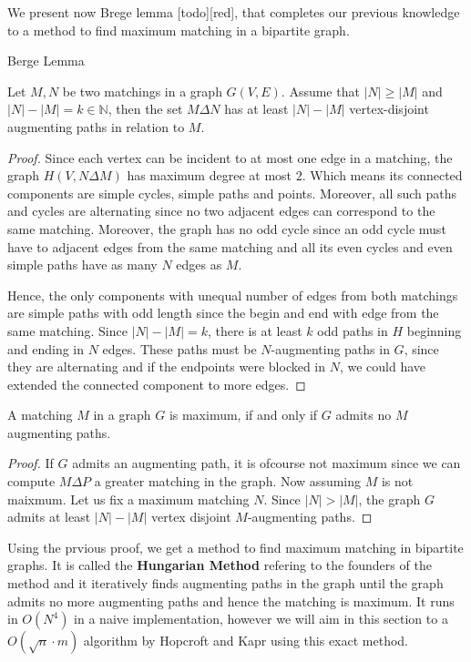 We present now Brege lemma [todo][red], that completes our previous knowledge to a method to find maximum matching in a bipartite graph.
\begin{lemma}Berge Lemma

	Let $M, N$ be two matchings in a graph $G(V, E)$. Assume that $|N| \geq |M|$ and $|N| - |M| = k \in \mathbb{N}$, then the set $M \Delta N$ has at least $|N| - |M|$ vertex-disjoint augmenting paths in relation to $M$.
\end{lemma}
\begin{proof}
	Since each vertex can be incident to at most one edge in a matching, the graph $H(V, N \Delta M)$ has maximum degree at most $2$. Which means its connected components are simple cycles, simple paths and points. Moreover, all such paths and cycles are alternating since no two adjacent edges can correspond to the same matching. Moreover, the graph has no odd cycle since an odd cycle must have to adjacent edges from the same matching and all its even cycles and even simple paths have as many $N$ edges as $M$.

	Hence, the only components with unequal number of edges from both matchings are simple paths with odd length since the begin and end with edge from the same matching. Since $|N| - |M| = k$, there is at least $k$ odd paths in $H$ beginning and ending in $N$ edges. These paths must be $N$-augmenting paths in $G$, since they are alternating and if the endpoints were blocked in $N$, we could have extended the connected component to more edges.
\end{proof}
\begin{corollary}
	A matching $M$ in a graph $G$ is maximum, if and only if $G$ admits no $M$ augmenting paths.
\end{corollary}
\begin{proof}
If $G$ admits an augmenting path, it is ofcourse not maximum since we can compute $M \Delta P$ a greater matching in the graph.
Now assuming $M$ is not maixmum. Let us fix a maximum matching $N$. Since $|N| > |M|$, the graph $G$ admits at least $|N| - |M|$ vertex disjoint $M$-augmenting paths.
\end{proof}

Using the prvious proof, we get a method to find maximum matching in bipartite graphs. It is called the \textbf{Hungarian Method} refering to the founders of the method and it iteratively finds augmenting paths in the graph until the graph admits no more augmenting paths and hence the matching is maximum. It runs in $O(N^4)$ in a naive implementation, however we will aim in this section to a $O(\sqrt n \cdot m)$ algorithm by Hopcroft and Kapr using this exact method.

